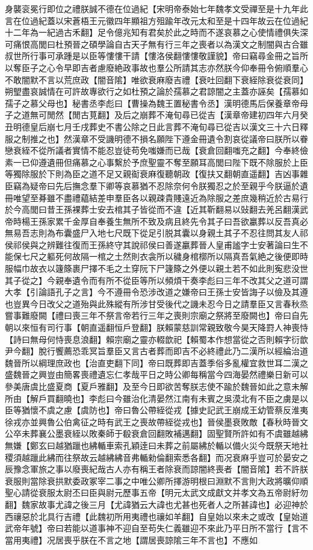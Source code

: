身襲衮冕行即位之禮朕誠不德在位過紀【宋明帝泰始七年魏孝文受禪至是十九年此言在位過紀蓋以宋蒼梧王元徽四年顯祖方殂踰年改元太和至是十四年故云在位過紀十二年為一紀過古禾翻】足令億兆知有君矣於此之時而不遂哀慕之心使情禮俱失深可痛恨高閭曰杜預晉之碩學論自古天子無有行三年之喪者以為漢文之制闇與古合雖叔世所行事可承踵是以臣等慺慺干請【慺洛侯翻慺慺敬謹貌】帝曰竊尋金冊之旨所以奪臣子之心令早即吉者慮廢絶政事故也羣公所請其志亦然朕今仰奉冊令俯順羣心不敢闇默不言以荒庶政【闇音隂】唯欲衰麻廢吉禮【衰吐回翻下衰絰除衰從衰同】朔朢盡哀誠情在可許故專欲行之如杜預之論於孺慕之君諒闇之主蓋亦誣矣【孺慕如孺子之慕父母也】秘書丞李彪曰【曹操為魏王置秘書令丞】漢明德馬后保養章帝母子之道無可閒然【閒古莧翻】及后之崩葬不淹旬尋已從吉【漢章帝建初四年六月癸丑明德皇后崩七月壬戌葬史不書公除之日此言葬不淹旬尋已從吉以漢文三十六日釋服之制推之也】然漢章不受譏明德不損名願陛下遵金冊遺令割哀從議帝曰朕所以眷戀衰絰不從所議者實情不能忍豈徒苟免嗤嫌而已哉【衰倉回翻嗤充之翻】今奉終儉素一已仰遵遺冊但痛慕之心事繫於予庶聖靈不奪至願耳高閭曰陛下既不除服於上臣等獨除服於下則為臣之道不足又親䘖衰麻復聽朝政【復扶又翻朝直遥翻】吉凶事雜臣竊為疑帝曰先后撫念羣下卿等哀慕猶不忍除奈何令朕獨忍之於至親乎今朕逼於遺冊唯望至朞雖不盡禮藴結差申羣臣各以親疎貴賤遠近為除服之差庶幾稍近於古易行於今高閭曰昔王孫裸葬士安去棺其子皆從而不違【近其靳翻易以䜴翻去羌呂翻漢武帝時楊王孫家累千金厚自奉養生無所不致及病且終先令其子曰吾欲臝葬以反吾真必無易吾志則為布囊盛尸入地七尺既下從足引脱其囊以身親土其子不忍往問其友人祁侯祁侯與之辨難往復而王孫終守其說祁侯曰善遂臝葬晉人皇甫謐字士安著論曰生不能保七尺之軀死何故隔一棺之土然則衣衾所以穢身棺槨所以隔真吾氣絶之後便即時服幅巾故衣以籧篨裹尸擇不毛之土穿阮下尸籧篨之外便以親土若不如此則寃悲没世其子從之】今親奉遺令而有所不從臣等所以頻煩干奏李彪曰三年不改其父之道可謂大孝【引論語孔子之言】今不遵冊令恐涉改道之嫌帝曰王孫士安皆誨子以儉及其遵也豈異今日改父之道殆與此殊縱有所涉甘受後代之譏未忍今日之請羣臣又言春秋烝嘗事難廢闕【禮曰喪三年不祭言帝若行三年之喪則宗廟之祭將至廢闕也】帝曰自先朝以來恒有司行事【朝直遥翻恒戶登翻】朕賴蒙慈訓常親致敬今昊天降罸人神喪恃【詩曰無母何恃喪息浪翻】賴宗廟之靈亦輟歆祀【賴蜀本作想當從之否則賴字衍歆尹今翻】脫行饗薦恐乖冥旨羣臣又言古者葬而即吉不必終禮此乃二漢所以經綸治道魏晉所以綱理庶政也【治直吏翻下同】帝曰既葬即吉蓋季俗多亂權宜救世耳二漢之盛魏晉之興豈由簡畧喪禮遺忘仁孝哉平日之時公卿每稱當今四海晏然禮樂日新可以參美唐虞比盛夏商【夏戶雅翻】及至今日即欲苦奪朕志使不踰於魏晉如此之意未解所由【解戶買翻曉也】李彪曰今雖治化清晏然江南有未賓之吳漠北有不臣之虜是以臣等猶懷不虞之慮【虞防也】帝曰魯公帶絰從戎【據史記武王崩成王幼管蔡反淮夷徐戎亦並興魯公伯禽征之時有武王之喪故帶絰從戎也】晉侯墨衰敗敵【春秋時晉文公卒未葬襄公墨衰絰以敗秦師于殽衰倉回翻敗補邁翻】固聖賢所許如有不虞雖越紼無嫌【鄭玄曰越猶躐也紼輴車索孔穎逹曰未葬之前屬紼於輴以備火災今既祭天地社稷須越躐此紼而往祭故云越紼紼音弗輴勑倫翻索悉各翻】而况衰麻乎豈可於晏安之辰豫念軍旅之事以廢喪紀哉古人亦有稱王者除衰而諒闇終喪者【闇音隂】若不許朕衰服則當除衰拱默委政冢宰二事之中唯公卿所擇游明根曰淵默不言則大政將曠仰順聖心請從衰服太尉丕曰臣與尉元歷事五帝【明元太武文成獻文并孝文為五帝尉紆勿翻】魏家故事尤諱之後三月【尤諱猶云大諱也尤甚也死者人之所甚諱也】必迎神於西禳惡於北具行吉禮【此魏初所用夷禮也禳如羊翻】自皇始以來未之或改【皇始道武帝年號】帝曰若能以道事神不迎自至苟失仁義雖迎不來此乃平日所不當行【言不當用夷禮】况居喪乎朕在不言之地【謂居喪諒隂三年不言也】不應如
